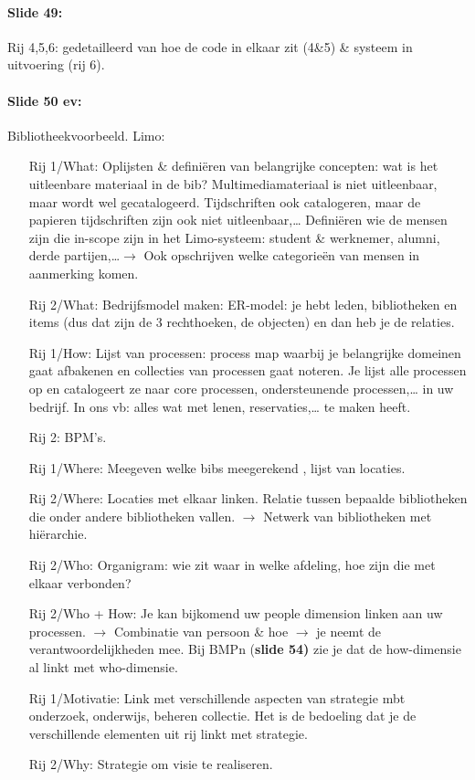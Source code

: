 \documentclass[10pt,a4paper]{report}
\begin{document}
\paragraph{Slide 49:}Rij 4,5,6: gedetailleerd van hoe de code in elkaar zit (4\&5) \& systeem in uitvoering (rij 6).

\paragraph{Slide 50 ev:}Bibliotheekvoorbeeld. Limo:
\begin{itemize}
\item[Rij 1/What:] Oplijsten \& definiëren van belangrijke concepten: wat is het uitleenbare materiaal in de bib? Multimediamateriaal is niet uitleenbaar, maar wordt wel gecatalogeerd. Tijdschriften ook catalogeren, maar de papieren tijdschriften zijn ook niet uitleenbaar,… Definiëren wie de mensen zijn die in-scope zijn in het Limo-systeem: student \& werknemer, alumni, derde partijen,\ldots $\rightarrow$ Ook opschrijven welke categorieën van mensen in aanmerking komen.
\item[Rij 2/What:] Bedrijfsmodel maken: ER-model: je hebt leden, bibliotheken en items (dus dat zijn de 3 rechthoeken, de objecten) en dan heb je de relaties.
\end{itemize}
\begin{itemize}
\item[Rij 1/How:] Lijst van processen: process map waarbij je belangrijke domeinen gaat afbakenen en collecties van processen gaat noteren. Je lijst alle processen op en catalogeert ze naar core processen, ondersteunende processen,… in uw bedrijf. In ons vb: alles wat met lenen, reservaties,… te maken heeft.
\item[Rij 2:] BPM's.
\end{itemize}
\begin{itemize}
\item[Rij 1/Where:] Meegeven welke bibs meegerekend , lijst van locaties.
\item[Rij 2/Where:] Locaties met elkaar linken. Relatie tussen bepaalde bibliotheken die onder andere bibliotheken vallen. $\rightarrow$ Netwerk van bibliotheken met hiërarchie.
\end{itemize}
\begin{itemize}
\item[Rij 2/Who:]Organigram: wie zit waar in welke afdeling, hoe zijn die met elkaar verbonden? 
\item[Rij 2/Who + How:] Je kan bijkomend uw people dimension linken aan uw processen. $\rightarrow$ Combinatie van persoon \& hoe $\rightarrow$ je neemt de verantwoordelijkheden mee. Bij BMPn (\textbf{slide 54)} zie je dat de how-dimensie al linkt met who-dimensie.
\end{itemize}
\begin{itemize}
\item[Rij 1/Motivatie:]Link met verschillende aspecten van strategie mbt onderzoek, onderwijs, beheren collectie. Het is de bedoeling dat je de verschillende elementen uit rij linkt met strategie.
\item[Rij 2/Why:] Strategie om visie te realiseren.
\end{itemize}
\end{document}
